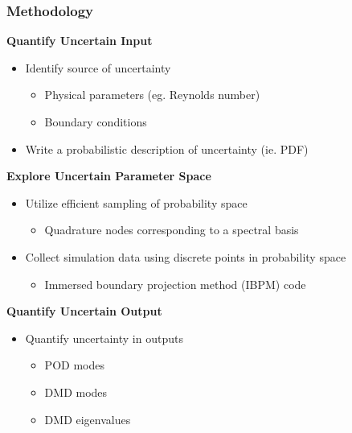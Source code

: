 \documentclass[9pt]{beamer}
\begin{document}
\begin{frame}
\frametitle{Methodology}
\label{sec-2-2}

\textbf{Quantify Uncertain Input}
\begin{itemize}
\item Identify source of uncertainty
\begin{itemize}
\item Physical parameters (eg. Reynolds number)
\item Boundary conditions
\end{itemize}
\item Write a probabilistic description of uncertainty (ie. PDF)
\end{itemize}
\textbf{Explore Uncertain Parameter Space}
\begin{itemize}
\item Utilize efficient sampling of probability space
\begin{itemize}
\item Quadrature nodes corresponding to a spectral basis
\end{itemize}
\item Collect simulation data using discrete points in probability space
\begin{itemize}
\item Immersed boundary projection method (IBPM) code
\end{itemize}
\end{itemize}
\textbf{Quantify Uncertain Output}
\begin{itemize}
\item Quantify uncertainty in outputs
\begin{itemize}
\item POD modes
\item DMD modes
\item DMD eigenvalues
\end{itemize}
\end{itemize}
\end{frame}
\end{document}
